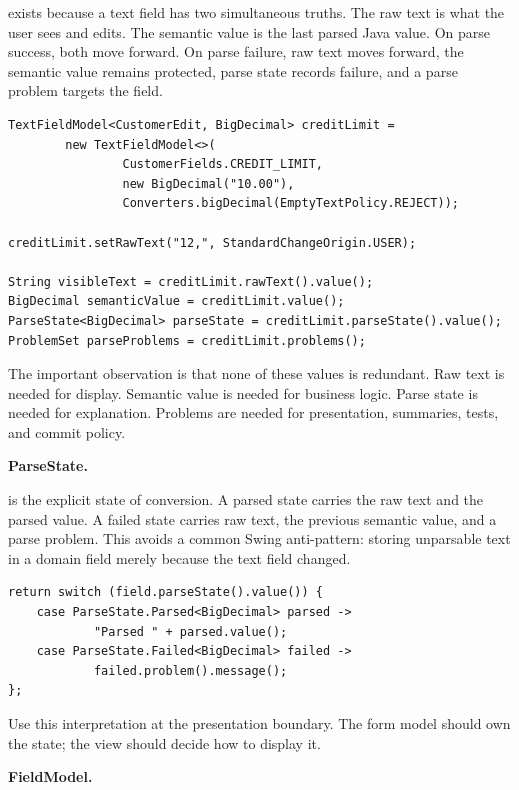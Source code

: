  exists because a text field has two simultaneous
truths. The raw text is what the user sees and edits. The semantic value is the
last parsed Java value. On parse success, both move forward. On parse failure,
raw text moves forward, the semantic value remains protected, parse state
records failure, and a parse problem targets the field.

\begin{lstlisting}[caption={Text editing preserves invalid intermediate input.}]
TextFieldModel<CustomerEdit, BigDecimal> creditLimit =
        new TextFieldModel<>(
                CustomerFields.CREDIT_LIMIT,
                new BigDecimal("10.00"),
                Converters.bigDecimal(EmptyTextPolicy.REJECT));

creditLimit.setRawText("12,", StandardChangeOrigin.USER);

String visibleText = creditLimit.rawText().value();
BigDecimal semanticValue = creditLimit.value();
ParseState<BigDecimal> parseState = creditLimit.parseState().value();
ProblemSet parseProblems = creditLimit.problems();
\end{lstlisting}

The important observation is that none of these values is redundant. Raw text is
needed for display. Semantic value is needed for business logic. Parse state is
needed for explanation. Problems are needed for presentation, summaries, tests,
and commit policy.

\textbf{ParseState.}

 is the explicit state of conversion. A parsed state carries
the raw text and the parsed value. A failed state carries raw text, the previous
semantic value, and a parse problem. This avoids a common Swing anti-pattern:
storing unparsable text in a domain field merely because the text field changed.

\begin{lstlisting}[caption={Interpreting parse state.}]
return switch (field.parseState().value()) {
    case ParseState.Parsed<BigDecimal> parsed ->
            "Parsed " + parsed.value();
    case ParseState.Failed<BigDecimal> failed ->
            failed.problem().message();
};
\end{lstlisting}

Use this interpretation at the presentation boundary. The form model should own
the state; the view should decide how to display it.

\textbf{FieldModel.}

